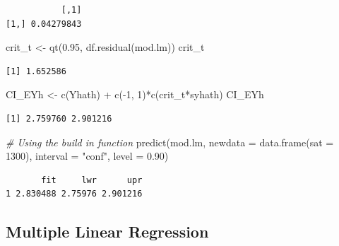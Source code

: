 \documentclass[
]{article}
\newenvironment{Shaded}{\begin{snugshade}}{\end{snugshade}}
\newcommand{\AttributeTok}[1]{\textcolor[rgb]{0.77,0.63,0.00}{#1}}
\newcommand{\CommentTok}[1]{\textcolor[rgb]{0.56,0.35,0.01}{\textit{#1}}}
\newcommand{\DecValTok}[1]{\textcolor[rgb]{0.00,0.00,0.81}{#1}}
\newcommand{\FloatTok}[1]{\textcolor[rgb]{0.00,0.00,0.81}{#1}}
\newcommand{\FunctionTok}[1]{\textcolor[rgb]{0.00,0.00,0.00}{#1}}
\newcommand{\NormalTok}[1]{#1}
\newcommand{\OtherTok}[1]{\textcolor[rgb]{0.56,0.35,0.01}{#1}}
\newcommand{\SpecialCharTok}[1]{\textcolor[rgb]{0.00,0.00,0.00}{#1}}
\newcommand{\StringTok}[1]{\textcolor[rgb]{0.31,0.60,0.02}{#1}}
\begin{document}
\begin{verbatim}
           [,1]
[1,] 0.04279843
\end{verbatim}

\begin{Shaded}
\begin{Highlighting}[]
\NormalTok{crit\_t }\OtherTok{\textless{}{-}} \FunctionTok{qt}\NormalTok{(}\FloatTok{0.95}\NormalTok{, }\FunctionTok{df.residual}\NormalTok{(mod.lm))}
\NormalTok{crit\_t}
\end{Highlighting}
\end{Shaded}

\begin{verbatim}
[1] 1.652586
\end{verbatim}

\begin{Shaded}
\begin{Highlighting}[]
\NormalTok{CI\_EYh }\OtherTok{\textless{}{-}} \FunctionTok{c}\NormalTok{(Yhath) }\SpecialCharTok{+} \FunctionTok{c}\NormalTok{(}\SpecialCharTok{{-}}\DecValTok{1}\NormalTok{, }\DecValTok{1}\NormalTok{)}\SpecialCharTok{*}\FunctionTok{c}\NormalTok{(crit\_t}\SpecialCharTok{*}\NormalTok{syhath)}
\NormalTok{CI\_EYh}
\end{Highlighting}
\end{Shaded}

\begin{verbatim}
[1] 2.759760 2.901216
\end{verbatim}

\begin{Shaded}
\begin{Highlighting}[]
\CommentTok{\# Using the build in function}
\FunctionTok{predict}\NormalTok{(mod.lm, }\AttributeTok{newdata =} \FunctionTok{data.frame}\NormalTok{(}\AttributeTok{sat =} \DecValTok{1300}\NormalTok{), }\AttributeTok{interval =} \StringTok{"conf"}\NormalTok{, }\AttributeTok{level =} \FloatTok{0.90}\NormalTok{)}
\end{Highlighting}
\end{Shaded}

\begin{verbatim}
       fit     lwr      upr
1 2.830488 2.75976 2.901216
\end{verbatim}

\hypertarget{multiple-linear-regression}{%
\subsection{Multiple Linear Regression}\label{multiple-linear-regression}}
\end{document}
